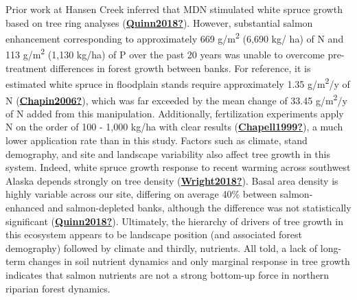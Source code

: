\documentclass [11pt, proquest] {uwthesis}[2015/03/03]
\begin{document}
Prior work at Hansen Creek inferred that MDN stimulated white spruce growth based on tree ring analyses (\protect\hyperlink{ref-Quinn2018}{\textbf{Quinn2018?}}). However, substantial salmon enhancement corresponding to approximately 669 g/m\textsuperscript{2} (6,690 kg/ ha) of N and 113 g/m\textsuperscript{2} (1,130 kg/ha) of P over the past 20 years was unable to overcome pre-treatment differences in forest growth between banks. For reference, it is estimated white spruce in floodplain stands require approximately 1.35 g/m\textsuperscript{2}/y of N (\protect\hyperlink{ref-Chapin2006}{\textbf{Chapin2006?}}), which was far exceeded by the mean change of 33.45 g/m\textsuperscript{2}/y of N added from this manipulation. Additionally, fertilization experiments apply N on the order of 100 - 1,000 kg/ha with clear results (\protect\hyperlink{ref-Chapell1999}{\textbf{Chapell1999?}}), a much lower application rate than in this study. Factors such as climate, stand demography, and site and landscape variability also affect tree growth in this system. Indeed, white spruce growth response to recent warming across southwest Alaska depends strongly on tree density (\protect\hyperlink{ref-Wright2018}{\textbf{Wright2018?}}). Basal area density is highly variable across our site, differing on average 40\% between salmon-enhanced and salmon-depleted banks, although the difference was not statistically significant (\protect\hyperlink{ref-Quinn2018}{\textbf{Quinn2018?}}). Ultimately, the hierarchy of drivers of tree growth in this ecosystem appears to be landscape position (and associated forest demography) followed by climate and thirdly, nutrients. All told, a lack of long-term changes in soil nutrient dynamics and only marginal response in tree growth indicates that salmon nutrients are not a strong bottom-up force in northern riparian forest dynamics.
\end{document}
